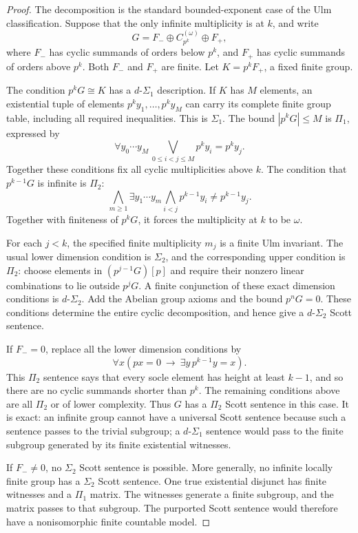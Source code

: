 \documentclass[11pt]{article}
\begin{document}
\begin{proof}
The decomposition is the standard bounded-exponent case of the Ulm
classification. Suppose that the only infinite multiplicity is at $k$,
and write
\[
 G=F_-\oplus C_{p^k}^{(\omega)}\oplus F_+,
\]
where $F_-$ has cyclic summands of orders below $p^k$, and $F_+$ has
cyclic summands of orders above $p^k$. Both $F_-$ and $F_+$ are finite.
Let $K=p^kF_+$, a fixed finite group.

The condition $p^kG\cong K$ has a $d\text{-}\Sigma_1$ description.
If $K$ has $M$ elements, an existential tuple of elements
$p^ky_1,\ldots,p^ky_M$ can carry its complete finite group table,
including all required inequalities. This is $\Sigma_1$.
The bound $|p^kG|\le M$ is $\Pi_1$, expressed by
\[
 \forall y_0\cdots y_M\,
 \bigvee_{0\le i<j\le M}p^ky_i=p^ky_j.
\]
Together these conditions fix all cyclic multiplicities above $k$.
The condition that $p^{k-1}G$ is infinite is $\Pi_2$:
\[
 \bigwedge_{m\ge1}\exists y_1\cdots y_m
 \bigwedge_{i<j}p^{k-1}y_i\ne p^{k-1}y_j.
\]
Together with finiteness of $p^kG$, it forces the multiplicity at
$k$ to be $\omega$.

For each $j<k$, the specified finite multiplicity $m_j$ is a finite
Ulm invariant. The usual lower dimension condition is $\Sigma_2$,
and the corresponding upper condition is $\Pi_2$: choose elements in
$(p^{j-1}G)[p]$ and require their nonzero linear combinations to lie
outside $p^jG$. A finite conjunction of these exact dimension
conditions is $d\text{-}\Sigma_2$.
Add the Abelian group axioms and the bound $p^nG=0$.
These conditions determine the entire cyclic decomposition, and hence
give a $d\text{-}\Sigma_2$ Scott sentence.

If $F_-=0$, replace all the lower dimension conditions by
\[
 \forall x\left(px=0\ \longrightarrow\
                 \exists y\,p^{k-1}y=x\right).
\]
This $\Pi_2$ sentence says that every socle element has height at least
$k-1$, and so there are no cyclic summands shorter than $p^k$.
The remaining conditions above are all $\Pi_2$ or of lower complexity.
Thus $G$ has a $\Pi_2$ Scott sentence in this case. It is exact:
an infinite group cannot have a universal Scott sentence because such
a sentence passes to the trivial subgroup; a $d\text{-}\Sigma_1$
sentence would pass to the finite subgroup generated by its finite
existential witnesses.

If $F_-\ne0$, no $\Sigma_2$ Scott sentence is possible. More
generally, no infinite locally finite group has a $\Sigma_2$ Scott
sentence. One true existential disjunct has finite witnesses and a
$\Pi_1$ matrix. The witnesses generate a finite subgroup, and the
matrix passes to that subgroup. The purported Scott sentence would
therefore have a nonisomorphic finite countable model.


\end{proof}
\end{document}
